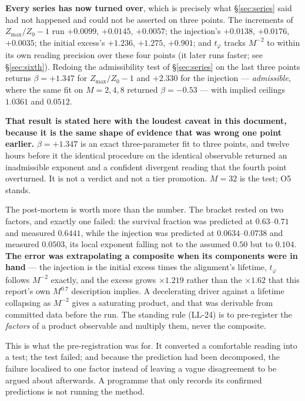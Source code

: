 \documentclass[11pt,a4paper]{article}
\theoremstyle{definition}
\theoremstyle{plain}
\begin{document}
\textbf{Every series has now turned over}, which is precisely what \S\ref{sec:series} said had
not happened and could not be asserted on three points. The increments of $Z_{\max}/Z_0-1$ run
$+0.0099$, $+0.0145$, $+0.0057$; the injection's $+0.0138$, $+0.0176$, $+0.0035$; the initial
excess's $+1.236$, $+1.275$, $+0.901$; and $t_\varphi$ tracks $M^{-2}$ to within its own
reading precision over these four points (it later runs faster; see \S\ref{sec:sixth}). Redoing the
admissibility test of \S\ref{sec:series} on the last three points returns $\beta = +1.347$ for
$Z_{\max}/Z_0-1$ and $+2.330$ for the injection --- \emph{admissible}, where the same fit on
$M=2,4,8$ returned $\beta=-0.53$ --- with implied ceilings $1.0361$ and $0.0512$.

\textbf{That result is stated here with the loudest caveat in this document, because it is the
same shape of evidence that was wrong one point earlier.} $\beta=+1.347$ is an exact
three-parameter fit to three points, and twelve hours before it the identical procedure on the
identical observable returned an inadmissible exponent and a confident divergent reading that
the fourth point overturned. It is not a verdict and not a tier promotion. $M=32$ is the test;
O5 stands.

The post-mortem is worth more than the number. The bracket rested on two factors, and exactly
one failed: the survival fraction was predicted at $0.63$--$0.71$ and measured $0.6441$, while
the injection was predicted at $0.0634$--$0.0738$ and measured $0.0503$, its local exponent
falling not to the assumed $0.50$ but to $0.104$. \textbf{The error was extrapolating a
composite when its components were in hand} --- the injection is the initial excess times the
alignment's lifetime, $t_\varphi$ follows $M^{-2}$ exactly, and the excess grows $\times 1.219$
rather than the $\times 1.62$ that this report's own $M^{0.7}$ description implies. A
decelerating driver against a lifetime collapsing as $M^{-2}$ gives a saturating product, and
that was derivable from committed data before the run. The standing rule (LL-24) is to
pre-register the \emph{factors} of a product observable and multiply them, never the composite.

This is what the pre-registration was for. It converted a comfortable reading into a test; the
test failed; and because the prediction had been decomposed, the failure localised to one factor
instead of leaving a vague disagreement to be argued about afterwards. A programme that only
records its confirmed predictions is not running the method.
\end{document}
